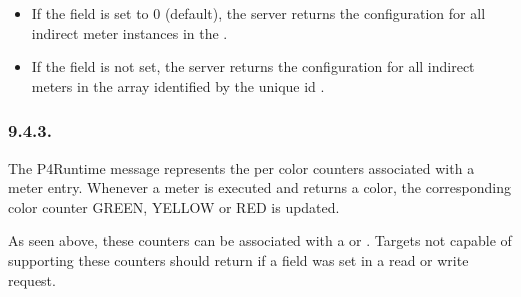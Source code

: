 \documentclass[11pt]{article}
\begin{document}
{%
\begin{itemize}%

\item{}
If the  field is set to 0 (default), the server returns the
configuration for all indirect meter instances in the .%

\item{}
If the  field is not set, the server returns the configuration for all
indirect meters in the array identified by the unique id .%
\end{itemize}%

\subsubsection{9.4.3.\hspace*{0.5em}}\label{sec-metercounterdata}%

\noindent{}The  P4Runtime message represents the per color counters
associated with a meter entry. Whenever a meter is executed and returns
a color, the corresponding color counter GREEN, YELLOW or RED is updated.%

As seen above, these counters can be associated with a  or
. Targets not capable of supporting these counters should return
 if a  field was set in a read or write
request.%

}
\end{document}
